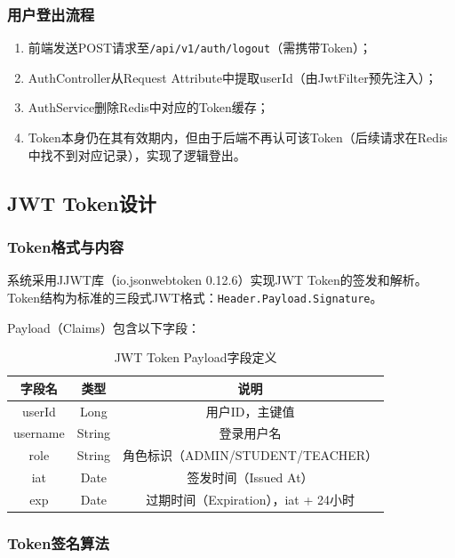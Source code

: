 \subsubsection{用户登出流程}

\begin{enumerate}
    \item 前端发送POST请求至\verb|/api/v1/auth/logout|（需携带Token）；
    \item AuthController从Request Attribute中提取userId（由JwtFilter预先注入）；
    \item AuthService删除Redis中对应的Token缓存；
    \item Token本身仍在其有效期内，但由于后端不再认可该Token（后续请求在Redis中找不到对应记录），实现了逻辑登出。
\end{enumerate}

\subsection{JWT Token设计}

\subsubsection{Token格式与内容}

系统采用JJWT库（io.jsonwebtoken 0.12.6）实现JWT Token的签发和解析。Token结构为标准的三段式JWT格式：\verb|Header.Payload.Signature|。

Payload（Claims）包含以下字段：

\begin{table}[htbp]
    \centering
    \caption{JWT Token Payload字段定义}
    \begin{tabular}{|c|c|c|}
        \hline
        \textbf{字段名} & \textbf{类型} & \textbf{说明} \\
        \hline
        userId & Long & 用户ID，主键值 \\
        \hline
        username & String & 登录用户名 \\
        \hline
        role & String & 角色标识（ADMIN/STUDENT/TEACHER） \\
        \hline
        iat & Date & 签发时间（Issued At） \\
        \hline
        exp & Date & 过期时间（Expiration），iat + 24小时 \\
        \hline
    \end{tabular}
\end{table}

\subsubsection{Token签名算法}

